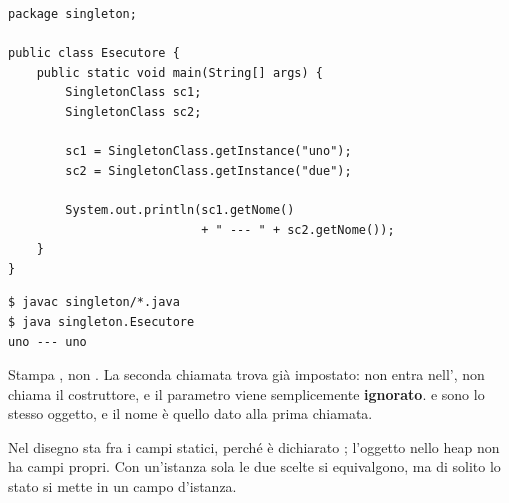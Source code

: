 \noindent\begin{minipage}[t]{0.55\textwidth}
\begin{lstlisting}[style=java, name=Esecutore.java]
package singleton;

public class Esecutore {
    public static void main(String[] args) {
        SingletonClass sc1;
        SingletonClass sc2;

        sc1 = SingletonClass.getInstance("uno");
        sc2 = SingletonClass.getInstance("due");

        System.out.println(sc1.getNome()
                           + " --- " + sc2.getNome());
    }
}
\end{lstlisting}
\end{minipage}\hfill
\begin{minipage}[t]{0.42\textwidth}
\begin{lstlisting}[style=shell, name=Terminale]
$ javac singleton/*.java
$ java singleton.Esecutore
uno --- uno
\end{lstlisting}
\end{minipage}

\noindent\begin{minipage}[c]{0.5\textwidth}
Stampa , non . La seconda chiamata trova  già impostato: non entra
nell', non chiama il costruttore, e il parametro  viene semplicemente \textbf{ignorato}.
 e  sono lo stesso oggetto, e il nome è quello dato alla prima chiamata.

Nel disegno  sta fra i campi statici, perché è dichiarato ; l'oggetto nello heap non ha campi
propri. Con un'istanza sola le due scelte si equivalgono, ma di solito lo stato si mette in un campo d'istanza.
\end{minipage}\hfill
\begin{minipage}[c]{0.46\textwidth}
\centering
{}
\end{minipage}

